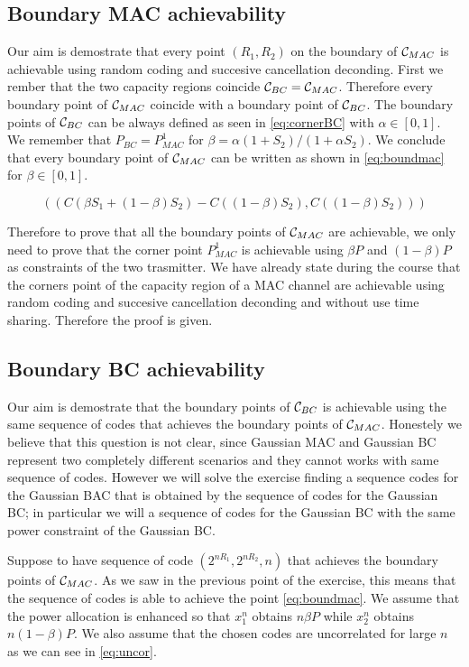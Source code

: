 \subsection{Boundary MAC achievability}

Our aim is demostrate that every point $(R_1,R_2)$ on the boundary of $\mathcal{C}_{MAC}$ is achievable using random coding and succesive cancellation deconding. First we rember that the two capacity regions coincide $\mathcal{C}_{BC}=\mathcal{C}_{MAC}$. Therefore every boundary point of $\mathcal{C}_{MAC}$ coincide with a boundary point of $\mathcal{C}_{BC}$. The boundary points of $\mathcal{C}_{BC}$ can be always defined as seen in \eqref{eq:cornerBC} with $\alpha \in [0,1]$. We remember that $P_{BC} = P_{MAC}^1$ for $\beta = \alpha(1+S_2)/(1+\alpha S_2)$. We conclude that every boundary point of $\mathcal{C}_{MAC}$ can be written as shown in \eqref{eq:boundmac} for $\beta \in [0,1]$.

\begin{equation}
	(\left( C (\beta S_1 + (1-\beta)S_2) - C((1-\beta)S_2) , C \left( (1-\beta)S_2 \right) \right))
	\label{eq:boundmac}
\end{equation}

Therefore to prove that all the boundary points of $\mathcal{C}_{MAC}$ are achievable, we only need to prove that the corner point $P_{MAC}^1$ is achievable using $\beta P$ and $(1-\beta) P$ as constraints of the two trasmitter. We have already state during the course that the corners point of the capacity region of a MAC channel are achievable using random coding and succesive cancellation deconding and without use time sharing. Therefore the proof is given.

\subsection{Boundary BC achievability}

Our aim is demostrate that the boundary points of $\mathcal{C}_{BC}$ is achievable using the same sequence of codes that achieves the boundary points of $\mathcal{C}_{MAC}$. Honestely we believe that this question is not clear, since Gaussian MAC and Gaussian BC represent two completely different scenarios and they cannot works with same sequence of codes. However we will solve the exercise finding a sequence codes for the Gaussian BAC that is obtained by the sequence of codes for the Gaussian BC; in particular we will a sequence of codes for the Gaussian BC with the same power constraint of the  Gaussian BC.


Suppose to have sequence of code $(2^{nR_1}, 2^{nR_2}, n)$ that achieves the boundary points of $\mathcal{C}_{MAC}$. As we saw in the previous point of the exercise, this means that the sequence of codes is able to achieve the point \eqref{eq:boundmac}. We assume that the power allocation is enhanced so that $x_1^n$ obtains $n \beta P$ while $x_2^n$ obtains $n (1-\beta) P$. We also assume that the chosen codes are uncorrelated for large $n$ as we can see in \eqref{eq:uncor}.


